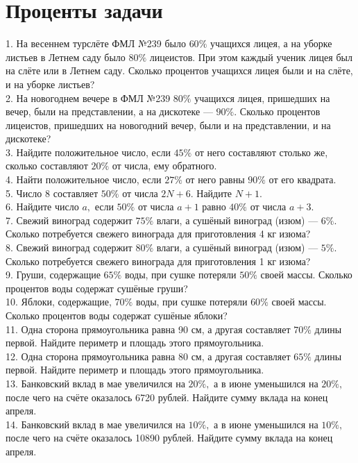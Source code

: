 \documentclass[12pt]{article}
\begin{document}
\section{Проценты задачи}
1. На весеннем турслёте ФМЛ №239 было $60\%$ учащихся лицея, а на уборке листьев в Летнем саду было $80\%$ лицеистов. При этом каждый ученик лицея был на слёте или в Летнем саду. Сколько процентов учащихся лицея были и на слёте, и на уборке листьев?\\
2. На новогоднем вечере в ФМЛ №239 $80\%$ учащихся лицея, пришедших на вечер, были на представлении, а на дискотеке --- $90\%$. Сколько процентов лицеистов, пришедших на новогодний вечер, были и на представлении, и на дискотеке?\\
3. Найдите положительное число, если $45\%$ от него составляют столько же, сколько составляют $20\%$ от числа, ему обратного.\\
4. Найти положительное число, если $27\%$ от него равны $90\%$ от его квадрата.\\
5. Число 8 составляет $50\%$ от числа $2N+6.$ Найдите $N+1.$\\
6. Найдите число $a,$ если $50\%$ от числа $a+1$ равно $40\%$ от числа $a+3.$\\
7. Свежий виноград содержит $75\%$ влаги, а сушёный виноград (изюм) --- $6\%.$
Сколько потребуется свежего винограда для приготовления 4 кг изюма?\\
8. Свежий виноград содержит $80\%$ влаги, а сушёный виноград (изюм) --- $5\%.$
Сколько потребуется свежего винограда для приготовления 1 кг изюма?\\
9. Груши, содержащие $65\%$ воды, при сушке потеряли $50\%$ своей массы. Сколько процентов воды содержат сушёные груши?\\
10. Яблоки, содержащие, $70\%$ воды, при сушке потеряли $60\%$ своей массы. Сколько
процентов воды содержат сушёные яблоки?\\
11. Одна сторона прямоугольника равна 90 см, а другая составляет $70\%$ длины первой. Найдите периметр и площадь этого прямоугольника.\\
12. Одна сторона прямоугольника равна 80 см, а другая составляет $65\%$ длины первой. Найдите периметр и площадь этого прямоугольника.\\
13. Банковский вклад в мае увеличился на $20\%,$ а в июне уменьшился на $20\%,$ после чего на счёте оказалось 6720 рублей. Найдите сумму вклада на конец апреля.\\
14. Банковский вклад в мае увеличился на $10\%,$ а в июне уменьшился на $10\%,$ после чего на счёте оказалось 10890 рублей. Найдите сумму вклада на конец апреля.\\
\end{document}
